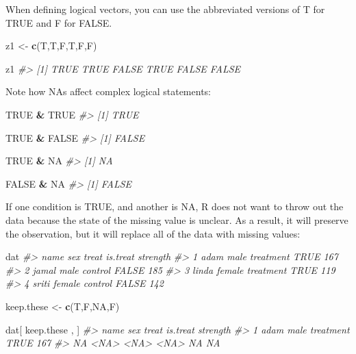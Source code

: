 \documentclass[]{book}
\newenvironment{Shaded}{\begin{snugshade}}{\end{snugshade}}
\newcommand{\CommentTok}[1]{\textcolor[rgb]{0.56,0.35,0.01}{\textit{#1}}}
\newcommand{\KeywordTok}[1]{\textcolor[rgb]{0.13,0.29,0.53}{\textbf{#1}}}
\newcommand{\NormalTok}[1]{#1}
\newcommand{\OperatorTok}[1]{\textcolor[rgb]{0.81,0.36,0.00}{\textbf{#1}}}
\newcommand{\OtherTok}[1]{\textcolor[rgb]{0.56,0.35,0.01}{#1}}
\newcommand{\StringTok}[1]{\textcolor[rgb]{0.31,0.60,0.02}{#1}}
\theoremstyle{definition}
\theoremstyle{definition}
\theoremstyle{definition}
\theoremstyle{remark}
\begin{document}
When defining logical vectors, you can use the abbreviated versions of T
for TRUE and F for FALSE.

\begin{Shaded}
\begin{Highlighting}[]

\NormalTok{z1 <-}\StringTok{ }\KeywordTok{c}\NormalTok{(T,T,F,T,F,F)}

\NormalTok{z1}
\CommentTok{#> [1]  TRUE  TRUE FALSE  TRUE FALSE FALSE}
\end{Highlighting}
\end{Shaded}

Note how NAs affect complex logical statements:

\begin{Shaded}
\begin{Highlighting}[]

\OtherTok{TRUE} \OperatorTok{&}\StringTok{ }\OtherTok{TRUE}
\CommentTok{#> [1] TRUE}

\OtherTok{TRUE} \OperatorTok{&}\StringTok{ }\OtherTok{FALSE}
\CommentTok{#> [1] FALSE}

\OtherTok{TRUE} \OperatorTok{&}\StringTok{ }\OtherTok{NA}
\CommentTok{#> [1] NA}

\OtherTok{FALSE} \OperatorTok{&}\StringTok{ }\OtherTok{NA}
\CommentTok{#> [1] FALSE}
\end{Highlighting}
\end{Shaded}

If one condition is TRUE, and another is NA, R does not want to throw
out the data because the state of the missing value is unclear. As a
result, it will preserve the observation, but it will replace all of the
data with missing values:

\begin{Shaded}
\begin{Highlighting}[]

\NormalTok{dat}
\CommentTok{#>    name    sex     treat is.treat strength}
\CommentTok{#> 1  adam   male treatment     TRUE      167}
\CommentTok{#> 2 jamal   male   control    FALSE      185}
\CommentTok{#> 3 linda female treatment     TRUE      119}
\CommentTok{#> 4 sriti female   control    FALSE      142}

\NormalTok{keep.these <-}\StringTok{ }\KeywordTok{c}\NormalTok{(T,F,}\OtherTok{NA}\NormalTok{,F)}

\NormalTok{dat[ keep.these , ]}
\CommentTok{#>    name  sex     treat is.treat strength}
\CommentTok{#> 1  adam male treatment     TRUE      167}
\CommentTok{#> NA <NA> <NA>      <NA>       NA       NA}
\end{Highlighting}
\end{Shaded}
\end{document}

